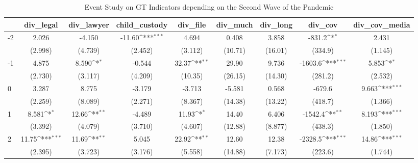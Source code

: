 \documentclass{article}
\begin{document}
{
\def\sym#1{\ifmmode^{#1}\else\(^{#1}\)\fi}
\begin{longtable}{l*{8}{c}}
\caption{Event Study on GT Indicators depending on the Second Wave of the Pandemic}\\
\hline\hline\endfirsthead\hline\endhead\hline\endfoot\endlastfoot
                &\multicolumn{1}{c}{div\_legal}&\multicolumn{1}{c}{div\_lawyer}&\multicolumn{1}{c}{child\_custody}&\multicolumn{1}{c}{div\_file}&\multicolumn{1}{c}{div\_much}&\multicolumn{1}{c}{div\_long}&\multicolumn{1}{c}{div\_cov}&\multicolumn{1}{c}{div\_cov\_media}\\
\hline
-2              &    2.026         &   -4.150         &   -11.60\sym{***}&    4.694         &    0.408         &    3.858         &   -831.2\sym{*}  &    2.431         \\
                &  (2.998)         &  (4.739)         &  (2.452)         &  (3.112)         &  (10.71)         &  (16.01)         &  (334.9)         &  (1.145)         \\
-1              &    4.875         &    8.590\sym{*}  &   -0.544         &    32.37\sym{**} &    29.90         &    9.736         &  -1603.6\sym{***}&    5.853\sym{*}  \\
                &  (2.730)         &  (3.117)         &  (4.209)         &  (10.35)         &  (26.15)         &  (14.30)         &  (281.2)         &  (2.532)         \\
0               &    3.287         &    8.775         &   -3.179         &   -3.713         &   -5.581         &    0.568         &   -679.6         &    9.663\sym{***}\\
                &  (2.259)         &  (8.089)         &  (2.271)         &  (8.367)         &  (14.38)         &  (13.22)         &  (418.7)         &  (1.366)         \\
1               &    8.581\sym{*}  &    12.66\sym{**} &   -4.489         &    11.93\sym{*}  &    14.40         &    6.406         &  -1542.4\sym{**} &    8.193\sym{***}\\
                &  (3.392)         &  (4.079)         &  (3.710)         &  (4.607)         &  (12.88)         &  (8.877)         &  (438.3)         &  (1.850)         \\
2               &    11.75\sym{***}&    11.69\sym{**} &    5.045         &    22.92\sym{**} &    12.60         &    12.38         &  -2328.5\sym{***}&    14.86\sym{***}\\
                &  (2.395)         &  (3.723)         &  (3.176)         &  (5.558)         &  (14.88)         &  (7.173)         &  (223.6)         &  (1.744)         \\

\end{longtable}}
\end{document}
